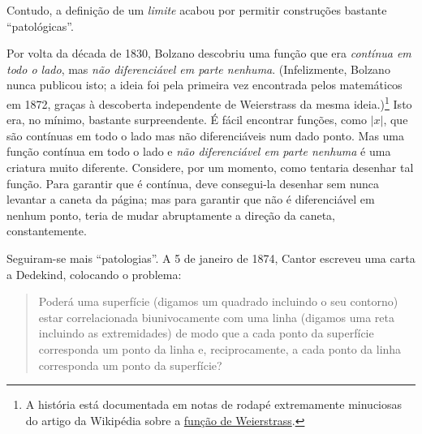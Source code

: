 \documentclass[../../../include/open-logic-section]{subfiles}
\begin{document}
\begin{patologiascompactas}

Contudo, a definição de um \emph{limite} acabou por permitir construções bastante ``patológicas''.
\vspace{-1pt}%

Por volta da década de 1830, Bolzano descobriu uma função que era
\emph{contínua em todo o lado}, mas \emph{não diferenciável em parte nenhuma}.
(Infelizmente, Bolzano nunca publicou isto; a ideia foi pela primeira vez
encontrada pelos matemáticos em 1872, graças à descoberta independente
de Weierstrass da mesma ideia.)\footnote{A história está
documentada em notas de rodapé extremamente minuciosas do artigo da Wikipédia sobre a
\href{http://en.wikipedia.org/wiki/Weierstrass_function}{função
de Weierstrass}.} Isto era, no mínimo, bastante surpreendente.
É fácil encontrar funções, como $|x|$, que são contínuas
em todo o lado mas não diferenciáveis num dado ponto. Mas uma
função contínua em todo o lado e \emph{não diferenciável em parte nenhuma} é uma criatura muito diferente. Considere, por um momento, como
tentaria desenhar tal função. Para garantir que é contínua, deve
consegui-la desenhar sem nunca levantar a caneta da página;
mas para garantir que não é diferenciável em nenhum ponto, teria de mudar
abruptamente a direção da caneta, constantemente.
\vspace{-1pt}%

Seguiram-se mais ``patologias''. A 5 de janeiro de 1874, Cantor escreveu uma
carta a Dedekind, colocando o problema:
\vspace{-2pt}%
\begin{quote}
Poderá uma superfície (digamos um quadrado incluindo o seu contorno) estar correlacionada biunivocamente com uma linha (digamos uma reta incluindo as extremidades) de modo que a cada ponto da superfície corresponda um ponto da
linha e, reciprocamente, a cada ponto da linha corresponda um
ponto da superfície?


\end{quote}
\end{patologiascompactas}
\end{document}
